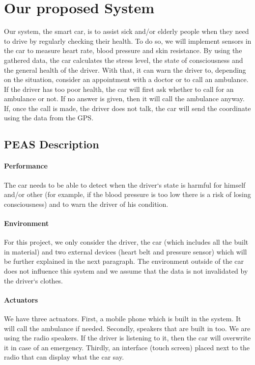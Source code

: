 \documentclass[a4paper]{article}		%
\begin{document}
\section{Our proposed System}
\indent
\indent Our system, the smart car, is to assist sick and/or elderly people when they need to drive by regularly checking their health.
To do so, we will implement sensors in the car to measure heart rate, blood pressure and skin resistance. By using the gathered data, the car calculates the stress level, the state of consciousness and the general health of the driver. With that, it can warn the driver to, depending on the situation, consider an appointment with a doctor or to call an ambulance. If the driver has too poor health, the car will first ask whether to call for an ambulance or not. If no answer is given, then it will call the ambulance anyway. If, once the call is made, the driver does not talk, the car will send the coordinate using the data from the GPS.
\subsection{PEAS Description}
\paragraph{Performance} The car needs to be able to detect when the driver`s state is harmful for himself and/or other (for example, if the blood pressure is too low there is a risk of losing consciousness) and to warn the driver of his condition.

\paragraph{Environment} For this project, we only consider the driver, the car (which includes all the built in material) and two external devices (heart belt and pressure sensor) which will be further explained in the next paragraph. The environment outside of the car does not influence this system and we assume that the data is not invalidated by the driver`s clothes.

\paragraph{Actuators} We have three actuators. First, a mobile phone which is built in the system. It will call the ambulance if needed. Secondly, speakers that are built in too. We are using the radio speakers. If the driver is listening to it, then the car will overwrite it in case of an emergency. Thirdly, an interface (touch screen) placed next to the radio that can display what the car say.
\end{document}
